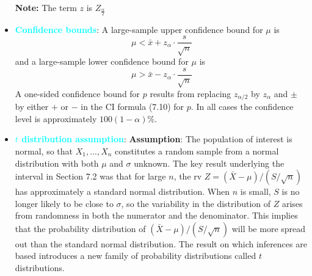 \documentclass{report}
\begin{document}
\begin{itemize}
            \bigbreak \noindent 
            \textbf{Note:} The term $z$ is $Z_{\frac{\alpha}{2}} $
        \item \textbf{\textcolor{cyan}{Confidence bounds}}:
            A large-sample upper confidence bound for $\mu$ is
            \[
                \mu < \bar{x} + z_{\alpha} \cdot \frac{s}{\sqrt{n}}
            \]
            and a large-sample lower confidence bound for $\mu$ is
            \[
                \mu > \bar{x} - z_{\alpha} \cdot \frac{s}{\sqrt{n}}
            \]
            A one-sided confidence bound for $p$ results from replacing $z_{\alpha/2}$ by $z_{\alpha}$ and $\pm$ by either $+$ or $-$ in the CI formula (7.10) for $p$. In all cases the confidence level is approximately $100(1 - \alpha)\%$.
        \item \textbf{\textcolor{cyan}{$t$ distribution assumption}}:
            \bigbreak \noindent 
            \textbf{Assumption}: The population of interest is normal, so that $X_{1}, ..., X_{n}$ constitutes a random sample from a normal distribution with both $\mu$ and $\sigma$ unknown.
            \bigbreak \noindent 
            The key result underlying the interval in Section 7.2 was that for large $n$, the rv $Z = (\bar{X} - \mu)/(S/\sqrt{n})$ has approximately a standard normal distribution. When $n$ is small, $S$ is no longer likely to be close to $\sigma$, so the variability in the distribution of $Z$ arises from randomness in both the numerator and the denominator. This implies that the probability distribution of $(\bar{X} - \mu)/(S/\sqrt{n})$ will be more spread out than the standard normal distribution. The result on which inferences are based introduces a new family of probability distributions called $t$ distributions.
            \bigbreak \noindent 


\end{itemize}
\end{document}

